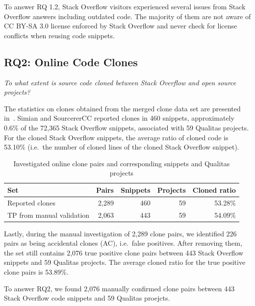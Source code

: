 \documentclass[10pt,journal,compsoc]{IEEEtran}
\newenvironment{boxquote}{\vspace{-1ex}\setlength{\FrameSep}{1\fboxsep}\begin{framed}\setlength{\parskip}{0.5\baselineskip}\setlength{\parindent}{0pt}}{\end{framed}}
\begin{document}
\begin{boxquote}
	To answer RQ 1.2, Stack Overflow visitors experienced several issues from Stack
Overflow answers including outdated code. The majority of them are not aware of
CC BY-SA 3.0 license enforced by Stack Overflow and never check for license
conflicts when reusing code snippets.
\end{boxquote}

\subsection{RQ2: Online Code Clones} 
\vspace{0.25cm}
\textit{To what extent is source
	code cloned between Stack Overflow and open source projects?}
\vspace{0.25cm}

The statistics on clones obtained from the merged clone data set are
presented in~. Simian and SourcererCC
reported clones in 460 snippets, approximately 0.6\% of the
72,365 Stack Overflow snippets, associated with 59 Qualitas
projects. For the cloned Stack Overflow snippets, the
average ratio of cloned code is 53.10\% (i.e.\ the number of cloned
lines of the cloned Stack Overflow snippet).

\begin{table}
	\caption{Investigated online clone pairs and corresponding snippets
		and Qualitas projects}
	\label{tab:snippets}
	\centering
	\begin{tabular}{p{2.2cm}rrrr}
		\toprule
		Set & Pairs & Snippets & Projects & Cloned ratio \\
		\midrule
		Reported clones & 2,289 & 460 & 59 & 53.28\% \\ 
		\midrule
		TP from manual validation & 2,063 & 443 & 59 & 54.09\% \\ 
		\bottomrule
	\end{tabular}
\end{table}

Lastly, during the manual investigation of 2,289 clone pairs, we identified 226 pairs
as being accidental clones (AC), i.e.~false positives. After removing
them, the set still contains 2,076 true positive clone pairs between 443 Stack
Overflow snippets and 59 Qualitas projects. The average cloned ratio for the
true positive clone pairs is 53.89\%.

\begin{boxquote}
	To answer RQ2, we found 2,076 manually confirmed clone pairs between 443 Stack Overflow code snippets
	and 59 Qualitas proejcts. 
\end{boxquote}
\end{document}

